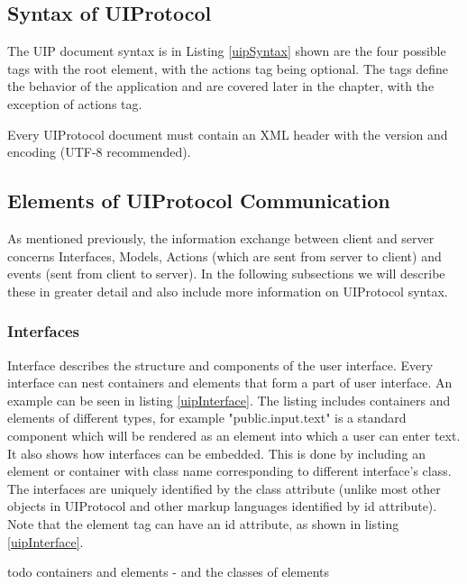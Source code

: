 \subsection{Syntax of UIProtocol}
The UIP document syntax is in Listing \ref{uipSyntax} shown are the four possible tags with the root element, with the actions tag being optional. The tags define the behavior of the application and are covered later in the chapter, with the exception of actions tag.



Every UIProtocol document must contain an XML header with the version and encoding (UTF-8 recommended).

\subsection{Elements of UIProtocol Communication}
As mentioned previously, the information exchange between client and server concerns Interfaces, Models, Actions (which are sent from server to client) and events (sent from client to server). In the following subsections we will describe these in greater detail and also include more information on UIProtocol syntax.

\subsubsection{Interfaces}
Interface describes the structure and components of the user interface. Every interface can nest containers and elements that form a part of user interface. An example can be seen in listing \ref{uipInterface}. The listing includes containers and elements of different types, for example "public.input.text" is a standard component which will be rendered as an element into which a user can enter text. It also shows how interfaces can be embedded. This is done by including an element or container with class name corresponding to different interface's class.\\The interfaces are uniquely identified by the class attribute (unlike most other objects in UIProtocol and other markup languages identified by id attribute). Note that the element tag can have an id attribute, as shown in listing \ref{uipInterface}.


todo containers and elements - and the classes of elements

